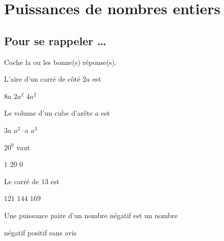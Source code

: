 \documentclass[../math2.tex]{subfiles}
\begin{document}
\chapter{Puissances de nombres entiers}
\section{Pour se rappeler \dots}
\begin{exercise}
	Coche la ou les bonne(s) réponse(s).\par
	\begin{tasks}
		\task L'aire d'un carré de côté $2a$ est
		\begin{qcm}
			\choice $8a$
			\choice $2a^2$
			\choice $4a^2$
		\end{qcm}

		\task Le volume d'un cube d'arête $a$ est
		\begin{qcm}
			\choice $3a$
			\choice $a^2 \cdot a$
			\choice $a^3$
		\end{qcm}

		\task $20^0$ vaut
		\begin{qcm}
			\choice $1$
			\choice $20$
			\choice $0$
		\end{qcm}

		\task Le carré de $13$ est
		\begin{qcm}
			\choice $121$
			\choice $144$
			\choice $169$
		\end{qcm}

		\task Une puissance paire d'un nombre négatif est un nombre
		\begin{qcm}
			\choice négatif
			\choice positif
			\choice sans avis
		\end{qcm}
	\end{tasks}
\end{exercise}
\end{document}
